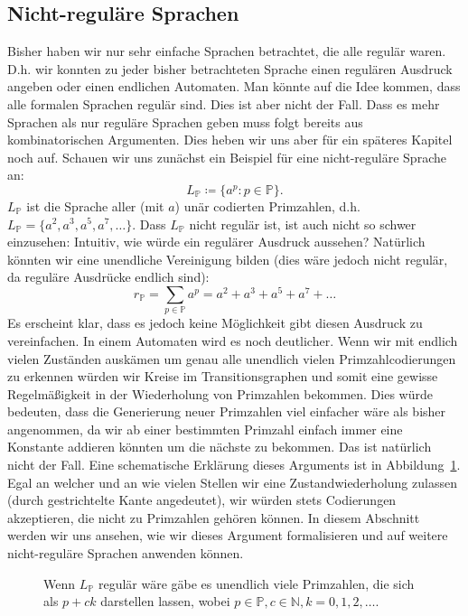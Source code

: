 \documentclass[11pt, a4paper]{article}
\theoremstyle{definition}
\theoremstyle{plain}
\numberwithin{equation}{section}
\begin{document}
\subsection{Nicht-reguläre Sprachen}\label{sec:regular_nonregular}
Bisher haben wir nur sehr einfache Sprachen betrachtet, die alle regulär waren. D.h. wir konnten zu jeder bisher betrachteten Sprache einen regulären Ausdruck angeben oder einen endlichen Automaten. Man könnte auf die Idee kommen, dass alle formalen Sprachen regulär sind. Dies ist aber nicht der Fall. Dass es mehr Sprachen als nur reguläre Sprachen geben muss folgt bereits aus kombinatorischen Argumenten. Dies heben wir uns aber für ein späteres Kapitel noch auf. Schauen wir uns zunächst ein Beispiel für eine nicht-reguläre Sprache an:
$$
	L_\mathbb{P} \coloneqq \{ a^p : p \in \mathbb{P} \}.
$$
$L_\mathbb{P}$ ist die Sprache aller (mit $a$) unär codierten Primzahlen, d.h. $L_\mathbb{P} = \{a^2, a^3, a^5, a^7, \ldots\}$. Dass $L_\mathbb{P}$ nicht regulär ist, ist auch nicht so schwer einzusehen: Intuitiv, wie würde ein regulärer Ausdruck aussehen? Natürlich könnten wir eine unendliche Vereinigung bilden (dies wäre jedoch nicht regulär, da reguläre Ausdrücke endlich sind):
$$
	r_\mathbb{P} = \sum_{p \in \mathbb{P}} a^p = a^2 + a^3 + a^5 + a^7 + \ldots
$$
Es erscheint klar, dass es jedoch keine Möglichkeit gibt diesen Ausdruck zu vereinfachen. In einem Automaten wird es noch deutlicher. Wenn wir mit endlich vielen Zuständen auskämen um genau alle unendlich vielen Primzahlcodierungen zu erkennen würden wir Kreise im Transitionsgraphen und somit eine gewisse Regelmäßigkeit in der Wiederholung von Primzahlen bekommen. Dies würde bedeuten, dass die Generierung neuer Primzahlen viel einfacher wäre als bisher angenommen, da wir ab einer bestimmten Primzahl einfach immer eine Konstante addieren könnten um die nächste zu bekommen. Das ist natürlich nicht der Fall. Eine schematische Erklärung dieses Arguments ist in Abbildung~\ref{fig:dfa_primes}. Egal an welcher und an wie vielen Stellen wir eine Zustandwiederholung zulassen (durch gestrichtelte Kante angedeutet), wir würden stets Codierungen akzeptieren, die nicht zu Primzahlen gehören können. In diesem Abschnitt werden wir uns ansehen, wie wir dieses Argument formalisieren und auf weitere nicht-reguläre Sprachen anwenden können.
\begin{figure}
	\centering
	
	\caption{Wenn $L_\mathbb{P}$ regulär wäre gäbe es unendlich viele Primzahlen, die sich als $p + ck$ darstellen lassen, wobei $p \in \mathbb{P}, c \in \mathbb{N}, k = 0, 1, 2, \ldots$.}
	\label{fig:dfa_primes}
\end{figure}
\end{document}
